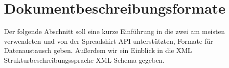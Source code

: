 \section{Dokumentbeschreibungsformate}

Der folgende Abschnitt soll eine kurze Einführung in die zwei am meisten verwendeten und von der Spreadshirt-API unterstützten, Formate für Datenaustausch geben. Außerdem wir ein Einblick in die XML Strukturbeschreibungssprache XML Schema gegeben.






